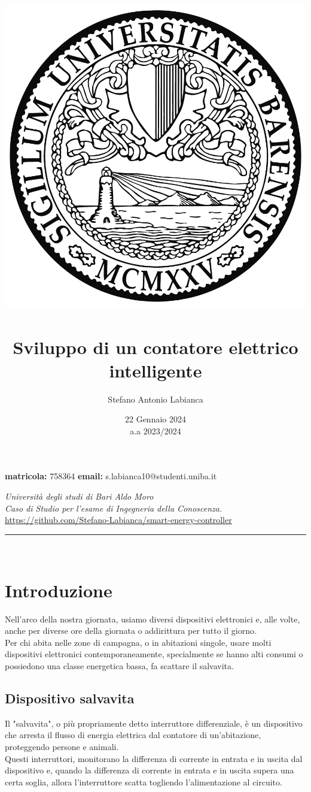 \documentclass[12pt, letterpaper]{article}
\title{
    \includegraphics[scale=0.5]{unibalogo.jpg}~\\[1cm]
    \textbf{Sviluppo di un contatore elettrico intelligente}
}
\author{Stefano Antonio Labianca}
\date{22 Gennaio 2024 \\[0.125cm] a.a 2023/2024}
\begin{document}
\maketitle


\textbf{matricola: } 758364
\hfill
\textbf{email: } s.labianca10@studenti.uniba.it
\hfill \\
\begin{center}
      \textit{Università degli studi di Bari Aldo Moro} \\
      \textit{Caso di Studio per l'esame di Ingegneria della Conoscenza.} \\[0.25cm]
      \url{https://github.com/Stefano-Labianca/smart-energy-controller}
\end{center}


\par\noindent\rule{\textwidth}{0.4pt}~\\[5cm]

\tableofcontents

\newpage

\section{Introduzione}

Nell'arco della nostra giornata, usiamo diversi dispositivi elettronici e,
alle volte, anche per diverse ore della giornata o addirittura per tutto
il giorno. \\ \break
Per chi abita nelle zone di campagna, o in abitazioni singole, usare molti
dispositivi elettronici contemporaneamente, specialmente se hanno alti consumi o
possiedono una classe energetica bassa, fa scattare il salvavita.

\subsection{Dispositivo salvavita}

Il "salvavita", o più propriamente detto interruttore differenziale, è un dispositivo
che arresta il flusso di energia elettrica dal contatore di
un'abitazione, proteggendo persone e animali. \\

\noindent Questi interruttori, monitorano la differenza di corrente in entrata
e in uscita dal dispositivo e, quando la differenza di corrente in entrata e in
uscita supera una certa soglia, allora l'interruttore scatta togliendo l'alimentazione
al circuito.
\end{document}
